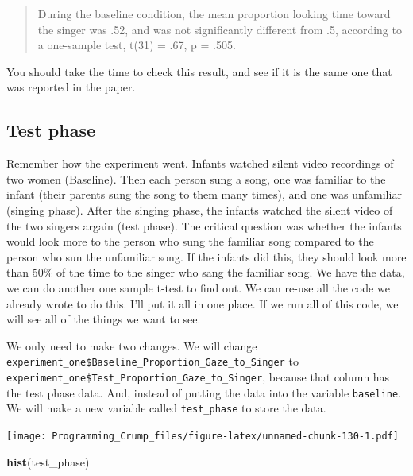 \documentclass[]{book}
\newenvironment{Shaded}{\begin{snugshade}}{\end{snugshade}}
\newcommand{\KeywordTok}[1]{\textcolor[rgb]{0.13,0.29,0.53}{\textbf{{#1}}}}
\newcommand{\StringTok}[1]{\textcolor[rgb]{0.31,0.60,0.02}{{#1}}}
\newcommand{\NormalTok}[1]{{#1}}
\theoremstyle{definition}
\theoremstyle{definition}
\theoremstyle{definition}
\theoremstyle{remark}
\begin{document}
\begin{quote}
During the baseline condition, the mean proportion looking time toward
the singer was .52, and was not significantly different from .5,
according to a one-sample test, t(31) = .67, p = .505.
\end{quote}

You should take the time to check this result, and see if it is the same
one that was reported in the paper.

\subsection{Test phase}\label{test-phase}

Remember how the experiment went. Infants watched silent video
recordings of two women (Baseline). Then each person sung a song, one
was familiar to the infant (their parents sung the song to them many
times), and one was unfamiliar (singing phase). After the singing phase,
the infants watched the silent video of the two singers argain (test
phase). The critical question was whether the infants would look more to
the person who sung the familiar song compared to the person who sun the
unfamiliar song. If the infants did this, they should look more than
50\% of the time to the singer who sang the familiar song. We have the
data, we can do another one sample t-test to find out. We can re-use all
the code we already wrote to do this. I'll put it all in one place. If
we run all of this code, we will see all of the things we want to see.

We only need to make two changes. We will change
\texttt{experiment\_one\$Baseline\_Proportion\_Gaze\_to\_Singer} to
\texttt{experiment\_one\$Test\_Proportion\_Gaze\_to\_Singer}, because
that column has the test phase data. And, instead of putting the data
into the variable \texttt{baseline}. We will make a new variable called
\texttt{test\_phase} to store the data.

\begin{Shaded}
\end{Shaded}

\texttt{[image: Programming\_Crump\_files/figure-latex/unnamed-chunk-130-1.pdf]}

\begin{Shaded}
\begin{Highlighting}[]
\KeywordTok{hist}\NormalTok{(test_phase)}
\end{Highlighting}
\end{Shaded}
\end{document}
